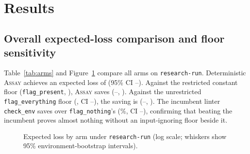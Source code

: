 \documentclass[11pt]{article}
\newcommand{\assay}{\textsc{Assay}}
\newcommand{\fe}{\texttt{flag\_everything}}
\newcommand{\fp}{\texttt{flag\_present}}
\begin{document}
\section{Results}
\label{sec:results}

\subsection{Overall expected-loss comparison and floor sensitivity}
\label{sec:headline}

Table~\ref{tab:arms} and Figure~\ref{fig:arms} compare all arms on \texttt{research-run}.
Deterministic \assay{} achieves an expected loss of \lossAssay{} (95\% CI
\loLossAssay--\hiLossAssay{}). Against the restricted constant floor (\fp{}, \floorRestricted{}),
\assay{} saves \savedRestricted{} (\loSavedRestricted--\hiSavedRestricted{}, \sepRestricted{}).
Against the unrestricted \fe{} floor (\lossFlagEverything{}, CI
\loLossFlagEverything--\hiLossFlagEverything{}), the saving is \savedFlagEverything{}
(\loSavedFlagEverything--\hiSavedFlagEverything{}, \sepFlagEverything{}). The incumbent linter
\texttt{check\_env} saves \savedCheckEnvVsNothing{} over \texttt{flag\_nothing}'s
\lossFlagNothing{} (\pctCheckEnvVsNothing{}\%, CI
\loSavedCheckEnvVsNothing--\hiSavedCheckEnvVsNothing{}), confirming that beating the incumbent
proves almost nothing without an input-ignoring floor beside it.

\begin{table}[t]\centering\small

\caption{Expected loss, recall, and precision on all \nEnv{} environments under
\texttt{research-run} (\nResamples{} environment bootstrap resamples). Rows marked $^\dagger$ are
post hoc constant floors computed from the committed ground truth. \assay{}+auditor is one draw of
a stochastic arm (\S\ref{sec:agent}); its environment-bootstrap interval omits run-to-run variance.}
\label{tab:arms}
\end{table}

\begin{figure}[t]\centering

\caption{Expected loss by arm under \texttt{research-run} (log scale; whiskers show 95\%
environment-bootstrap intervals).}
\label{fig:arms}
\end{figure}
\end{document}
